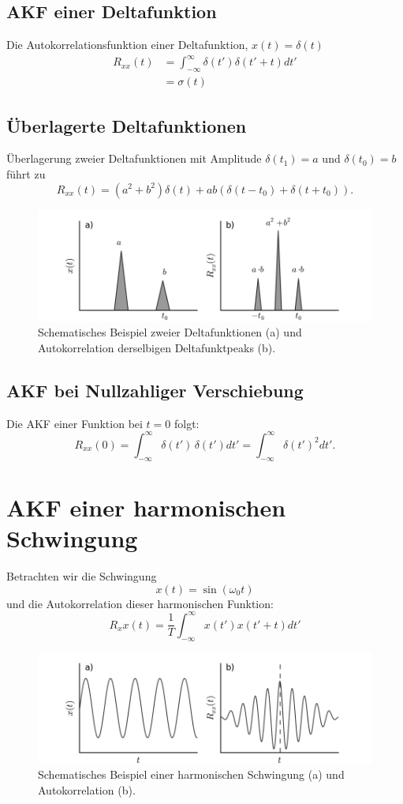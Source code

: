 \subsection*{AKF einer Deltafunktion}
Die Autokorrelationsfunktion einer Deltafunktion, $x(t) = \delta(t)$
\begin{align*}
R_{xx}(t) & = \int_{-\infty}^\infty \delta(t') \delta(t'+t) dt'\\
& = \sigma(t)
\end{align*}

\subsection*{Überlagerte Deltafunktionen}
Überlagerung zweier Deltafunktionen mit Amplitude $\delta(t_1) = a$ und $\delta(t_0) = b$ führt zu
\[
R_{xx}(t) = (a^2 + b^2)\delta(t) + ab(\delta(t-t_0) + \delta(t+t_0)).
\]

\begin{figure}[h!]
\centering
\includegraphics[width=.9\tw]{fig/09-Korrelation/02-example_deltafct.png}
\caption{Schematisches Beispiel zweier Deltafunktionen (a) und Autokorrelation derselbigen Deltafunktpeaks (b).}
\end{figure}

\subsection*{AKF bei Nullzahliger Verschiebung}
Die AKF einer Funktion bei $t=0$ folgt:
\[
R_{xx}(0) = \int_{-\infty}^\infty \delta(t')\,\delta(t') dt' = \int_{-\infty}^\infty \delta(t')^2 dt'.
\]


\section*{AKF einer harmonischen Schwingung}
Betrachten wir die Schwingung
\[
x(t) = \sin(\omega_0 t)
\]
und die Autokorrelation dieser harmonischen Funktion:
\[
R_xx(t) = \frac{1}{T} \int_{-\infty}^\infty x(t') x(t'+t) dt'
\]
\begin{figure}[h!]
\centering
\includegraphics[width=.9\tw]{fig/09-Korrelation/03-example_harmonic.png}
\caption{Schematisches Beispiel einer harmonischen Schwingung (a) und Autokorrelation (b).}
\end{figure}

